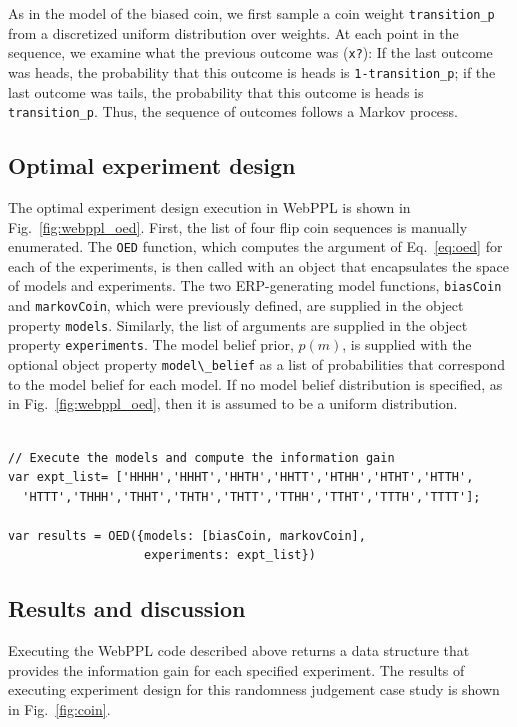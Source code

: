 \documentclass{article}
\begin{document}
As in the model of the biased coin, we first sample a coin weight \lstinline{transition_p} from a discretized uniform distribution over weights. At each point in the sequence, we examine what the previous outcome was (\lstinline{x?}): If the last outcome was heads, the probability that this outcome is heads is \lstinline{1-transition_p}; if the last outcome was tails, the probability that this outcome is heads is \lstinline{transition_p}. Thus, the sequence of outcomes follows a Markov process.  

\subsection{Optimal experiment design}

The optimal experiment design execution in WebPPL is shown in Fig.~\ref{fig:webppl_oed}. First, the list of four flip coin sequences is manually enumerated. The \lstinline{OED} function, which computes the argument of Eq.~\ref{eq:oed} for each of the experiments, is then called with an object that encapsulates the space of models and experiments. The two ERP-generating model functions, \lstinline{biasCoin} and \lstinline{markovCoin}, which were previously defined, are supplied in the object property \lstinline{models}. Similarly, the list of arguments are supplied in the object property \lstinline{experiments}. The model belief prior, $p(m)$, is supplied with the optional object property \lstinline{model\_belief} as a list of probabilities that correspond to the model belief for each model. If no model belief distribution is specified, as in Fig.~\ref{fig:webppl_oed}, then it is assumed to be a uniform distribution. 

\begin{lstlisting}[caption=Markov coin model]

// Execute the models and compute the information gain
var expt_list= ['HHHH','HHHT','HHTH','HHTT','HTHH','HTHT','HTTH',
  'HTTT','THHH','THHT','THTH','THTT','TTHH','TTHT','TTTH','TTTT'];

var results = OED({models: [biasCoin, markovCoin], 
                   experiments: expt_list})

\end{lstlisting}

\subsection{Results and discussion}

Executing the WebPPL code described above returns a data structure that provides the information gain for each specified experiment. The results of executing experiment design for this randomness judgement case study is shown in Fig.~\ref{fig:coin}.
\end{document}
